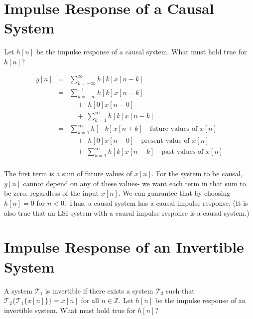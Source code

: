 \documentclass[11pt]{article}
\begin{document}
\section{Impulse Response of a Causal System}
Let $h[n]$ be the impulse response of a causal system. What must hold true for $h[n]$?

{\color{blue}
\begin{eqnarray*}
y[n] &=& \sum\limits_{k=-\infty}^\infty h[k]x[n-k] \\
&=& \sum\limits_{k=-\infty}^{-1} h[k]x[n-k] \\
&& \quad +\ \ h[0]x[n-0] \\
&& \quad +\ \sum\limits_{k=1}^\infty h[k]x[n-k] \\
&=& \sum\limits_{k=1}^\infty h[-k]x[n+k] \quad \text{future values of $x[n]$} \\
&& \quad +\ \ h[0]x[n-0] \quad \text{present value of $x[n]$}\\
&& \quad +\ \sum\limits_{k=1}^\infty h[k]x[n-k] \quad \text{past values of $x[n]$}\\
\end{eqnarray*}

The first term is a sum of future values of $x[n]$. For the system to be causal, $y[n]$ cannot depend on any of these values- we want each term in that sum to be zero, regardless of the input $x[n]$. We can guarantee that by choosing $h[n] = 0$ for $n < 0$. Thus, a causal system has a causal impulse response. (It is also true that an LSI system with a causal impulse response is a causal system.)
}

\section{Impulse Response of an Invertible System}
A system $\mathcal{T}_1$ is invertible if there exists a system $\mathcal{T}_2$ such that $\mathcal{T}_2\{\mathcal{T}_1\{x[n]\}\} = x[n]$ for all $n \in \mathbb{Z}$. Let $h[n]$ be the impulse response of an invertible system. What must hold true for $h[n]$?
\end{document}
